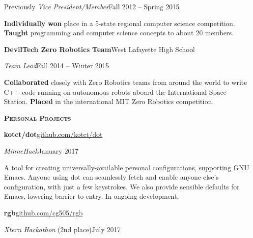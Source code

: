 \documentclass[11pt]{article}
\newcommand{\sectionfont}{\Large\scshape\bfseries\color{cg505green}}
\newcommand{\impact}[1]{\textcolor{cg505green}{\nohyphens{#1}}}
\begin{document}
\begin{minipage}[t]{0.67\textwidth}
\begin{adjustwidth}{10pt}{}
    Previously \emph{Vice President/Member}\hfill Fall 2012 -- Spring 2015

    \textbf{Individually} \impact{\textbf{won}  place} in a 5-state regional computer science competition.
    \textbf{Taught} programming and computer science concepts to about 20 members.
  \end{adjustwidth}

  \textbf{DevilTech Zero Robotics Team}\hfill West Lafayette High School
  \begin{adjustwidth}{10pt}{}
    \emph{Team Lead}\hfill Fall 2014 -- Winter 2015

    \textbf{Collaborated} closely with Zero Robotics teams from \impact{around the world} to write C++ code running on autonomous robots aboard the International Space Station.
    \impact{\textbf{Placed} } in the international MIT Zero Robotics competition.
  \end{adjustwidth}



  \vspace{10pt}

  {\sectionfont Personal Projects}

  \textbf{kotct/dot}\hfill\href{https://github.com/kotct/dot/}{github.com/kotct/dot}
  \begin{adjustwidth}{10pt}{}
    \emph{MinneHack}\hfill January 2017

    A tool for creating universally-available personal configurations, supporting GNU Emacs.
    Anyone using dot can seamlessly fetch and enable anyone else's configuration, with just a few keystrokes.
    We also provide sensible defaults for Emacs, lowering barrier to entry.
    In ongoing development.
  \end{adjustwidth}

  \textbf{rgb}\hfill\href{https://github.com/cg505/rgb/}{github.com/cg505/rgb}
  \begin{adjustwidth}{10pt}{}
    \emph{Xtern Hackathon} (2nd place)\hfill July 2017


\end{adjustwidth}
\end{minipage}
\end{document}
